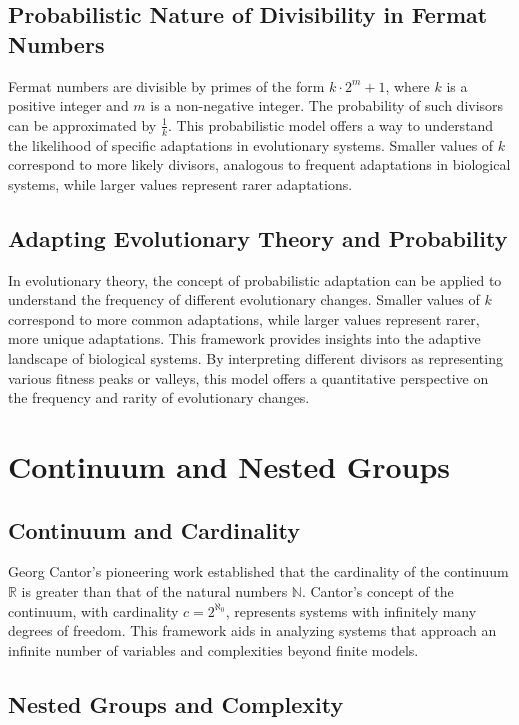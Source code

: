 \documentclass[12pt]{article}
\begin{document}
\subsection{Probabilistic Nature of Divisibility in Fermat Numbers}

Fermat numbers are divisible by primes of the form \( k \cdot 2^m + 1 \), where \( k \) is a positive integer and \( m \) is a non-negative integer. The probability of such divisors can be approximated by \( \frac{1}{k} \). This probabilistic model offers a way to understand the likelihood of specific adaptations in evolutionary systems. Smaller values of \( k \) correspond to more likely divisors, analogous to frequent adaptations in biological systems, while larger values represent rarer adaptations.

\subsection{Adapting Evolutionary Theory and Probability}

In evolutionary theory, the concept of probabilistic adaptation can be applied to understand the frequency of different evolutionary changes. Smaller values of \( k \) correspond to more common adaptations, while larger values represent rarer, more unique adaptations. This framework provides insights into the adaptive landscape of biological systems. By interpreting different divisors as representing various fitness peaks or valleys, this model offers a quantitative perspective on the frequency and rarity of evolutionary changes.

\section{Continuum and Nested Groups}

\subsection{Continuum and Cardinality}

Georg Cantor’s pioneering work established that the cardinality of the continuum \( \mathbb{R} \) is greater than that of the natural numbers \( \mathbb{N} \). Cantor’s concept of the continuum, with cardinality \( c = 2^{\aleph_0} \), represents systems with infinitely many degrees of freedom. This framework aids in analyzing systems that approach an infinite number of variables and complexities beyond finite models.

\subsection{Nested Groups and Complexity}
\end{document}
